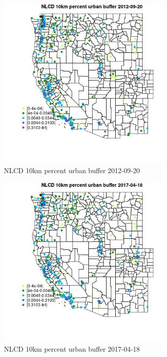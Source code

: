 \begin{figure} 
\centering  
\includegraphics[width=0.77\textwidth]{Code_Outputs/Report_ML_input_PM25_Step4_part_e_de_duplicated_aves_compiled_2019-05-14wNAs_MapObsNLCD_10km_percent_urban_buffer2012-09-20.jpg} 
\caption{\label{fig:Report_ML_input_PM25_Step4_part_e_de_duplicated_aves_compiled_2019-05-14wNAsMapObsNLCD_10km_percent_urban_buffer2012-09-20}NLCD 10km percent urban buffer 2012-09-20} 
\end{figure} 
 

\clearpage 

\begin{figure} 
\centering  
\includegraphics[width=0.77\textwidth]{Code_Outputs/Report_ML_input_PM25_Step4_part_e_de_duplicated_aves_compiled_2019-05-14wNAs_MapObsNLCD_10km_percent_urban_buffer2017-04-18.jpg} 
\caption{\label{fig:Report_ML_input_PM25_Step4_part_e_de_duplicated_aves_compiled_2019-05-14wNAsMapObsNLCD_10km_percent_urban_buffer2017-04-18}NLCD 10km percent urban buffer 2017-04-18} 
\end{figure} 
 

